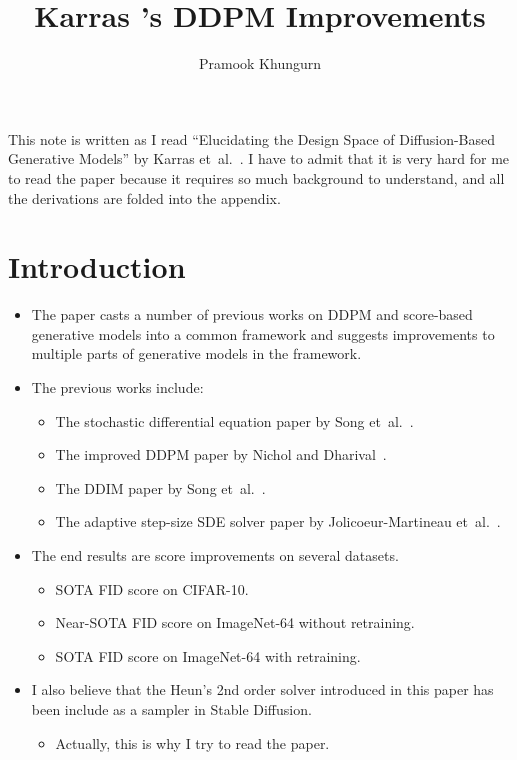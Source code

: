 \documentclass[10pt]{article}
\title{Karras \etal's DDPM Improvements}
\author{Pramook Khungurn}
\newcommand{\etal}{{et~al.}}
\begin{document}
\maketitle

This note is written as I read ``Elucidating the Design Space of Diffusion-Based Generative Models'' by Karras \etal~\cite{Karras:2022}. I have to admit that it is very hard for me to read the paper because it requires so much background to understand, and all the derivations are folded into the appendix.

\section{Introduction}

\begin{itemize}
  \item The paper casts a number of previous works on DDPM and score-based generative models into a common framework and suggests improvements to multiple parts of generative models in the framework.
  
  \item The previous works include:
  \begin{itemize}
    \item The stochastic differential equation paper by Song \etal~\cite{Song:2021}.
    \item The improved DDPM paper by Nichol and Dharival~\cite{Nichol:2021}.
    \item The DDIM paper by Song \etal~\cite{Song:DDIM:2020}.
    \item The adaptive step-size SDE solver paper by Jolicoeur-Martineau \etal~\cite{Jolicoeur-Martineau:2021}.
  \end{itemize}

  \item The end results are score improvements on several datasets.
  \begin{itemize}
    \item SOTA FID score on CIFAR-10.
    \item Near-SOTA FID score on ImageNet-64 without retraining.
    \item SOTA FID score on ImageNet-64 with retraining.
  \end{itemize}

  \item I also believe that the Heun's 2nd order solver introduced in this paper has been include as a sampler in Stable Diffusion.
  \begin{itemize}
    \item Actually, this is why I try to read the paper.
  \end{itemize}
\end{itemize}
\end{document}
